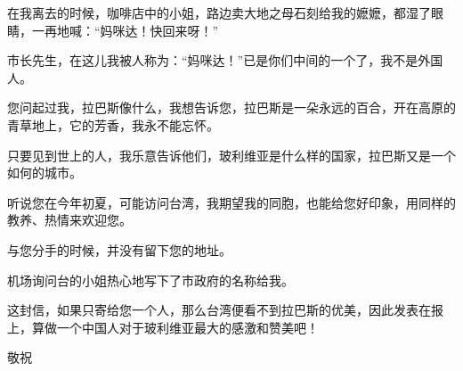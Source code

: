 \par 在我离去的时候，咖啡店中的小姐，路边卖大地之母石刻给我的嬷嬷，都湿了眼睛，一再地喊：“妈咪达！快回来呀！”
\par 市长先生，在这儿我被人称为：“妈咪达！”已是你们中间的一个了，我不是外国人。
\par 您问起过我，拉巴斯像什么，我想告诉您，拉巴斯是一朵永远的百合，开在高原的青草地上，它的芳香，我永不能忘怀。
\par 只要见到世上的人，我乐意告诉他们，玻利维亚是什么样的国家，拉巴斯又是一个如何的城市。
\par 听说您在今年初夏，可能访问台湾，我期望我的同胞，也能给您好印象，用同样的教养、热情来欢迎您。
\par 与您分手的时候，并没有留下您的地址。
\par 机场询问台的小姐热心地写下了市政府的名称给我。
\par 这封信，如果只寄给您一个人，那么台湾便看不到拉巴斯的优美，因此发表在报上，算做一个中国人对于玻利维亚最大的感激和赞美吧！
\par 敬祝
\par {}
\par {}
\par {}
